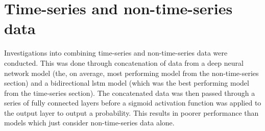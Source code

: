 \documentclass{article}
\begin{document}
\section{Time-series and non-time-series data}

Investigations into combining time-series and non-time-series data were conducted. This was done through concatenation of data from a deep neural network model (the, on average, most performing model from the non-time-series section) and a bidirectional lstm model (which was the best performing model from the time-series section). The concatenated data was then passed through a series of fully connected layers before a sigmoid activation function was applied to the output layer to output a probability. This results in poorer performance than models which just consider non-time-series data alone. 
\end{document}
